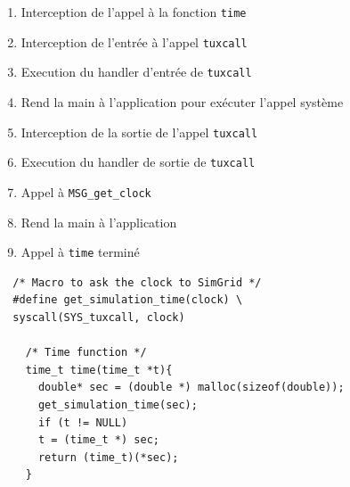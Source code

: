 \begin{center}
\begin{minipage}{10cm}
\begin{enumerate}
\item Interception de l'appel à la fonction \texttt{time}
\item Interception de l'entrée à l'appel \texttt{tuxcall}
\item Execution du handler d'entrée de \texttt{tuxcall}
\item Rend la main à l'application pour exécuter l'appel système
\item Interception de la sortie de l'appel \texttt{tuxcall}
\item Execution du handler de sortie de \texttt{tuxcall}
\item Appel à \texttt{MSG\_get\_clock}
\item Rend la main à l'application
\item Appel à \texttt{time} terminé
\end{enumerate}
\end{minipage}
\end{center}

\newpage
{}
\begin{lstlisting}
  /* Macro to ask the clock to SimGrid */
  #define get_simulation_time(clock) \
  syscall(SYS_tuxcall, clock)

    /* Time function */
    time_t time(time_t *t){
      double* sec = (double *) malloc(sizeof(double));
      get_simulation_time(sec);
      if (t != NULL)
      t = (time_t *) sec;  
      return (time_t)(*sec);    
    }
\end{lstlisting}

